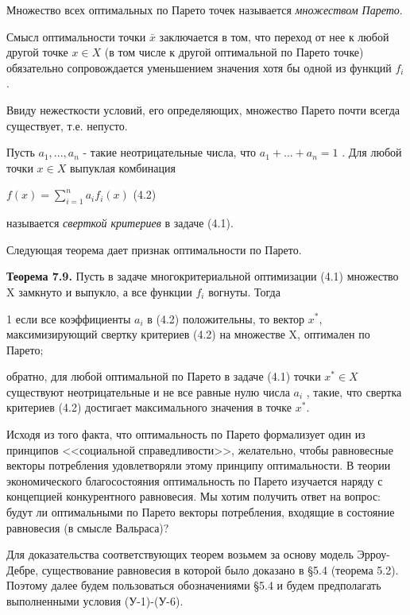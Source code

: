 \documentclass[12pt, 4paper]{book}
\begin{document}
{Множество всех оптимальных по Парето точек называется \textit{множеством Парето}.
\par

Смысл оптимальности точки $\bar{x}$  заключается в том, что переход от нее к любой другой точке $x \in X$ (в том числе к другой оптимальной по Парето точке) обязательно сопровождается уменьшением значения хотя бы одной из функций $f_i$.
\par

Ввиду нежесткости условий, его определяющих, множество Парето почти всегда существует, т.е. непусто.
\par

Пусть $a_1,...,a_n$ - такие неотрицательные числа, что $a_1+...+a_n = 1$ . Для любой точки $x \in X$ выпуклая комбинация 
\begin{center}
$f(x)=\sum\limits_{i=1}^n a_i f_i(x)$ (4.2)
\end{center}
называется \textit{сверткой критериев} в задаче (4.1).
\par

Следующая теорема дает признак оптимальности по Парето.
\par

\textbf{Теорема 7.9.} Пусть в задаче многокритериальной оптимизации (4.1) множество X замкнуто и выпукло, а все функции $f_i$ вогнуты. Тогда
\par

1 если все коэффициенты $a_i$ в (4.2) положительны, то вектор $x^{*}$, максимизирующий свертку критериев (4.2) на множестве X, оптимален по Парето;
\par

обратно, для любой оптимальной по Парето в задаче (4.1) точки $x^{*} \in X$ существуют неотрицательные и не все равные нулю числа $a_i$ , такие, что свертка критериев (4.2) достигает максимального значения в точке $x^{*}$.
\par

Исходя из того факта, что оптимальность по Парето формализует один из принципов <<социальной справедливости>>, желательно, чтобы равновесные векторы потребления удовлетворяли этому принципу оптимальности. В теории экономического благосостояния оптимальность по Парето изучается наряду с концепцией конкурентного равновесия. Мы хотим получить ответ на вопрос: будут ли оптимальными по Парето векторы потребления, входящие в состояние равновесия (в смысле Вальраса)?
\par

Для доказательства соответствующих теорем возьмем за основу модель Эрроу-Дебре, существование равновесия в которой было доказано в §5.4 (теорема 5.2). Поэтому далее будем пользоваться обозначениями §5.4 и будем предполагать выполненными условия (У-1)-(У-6).
\par

}
\end{document}
